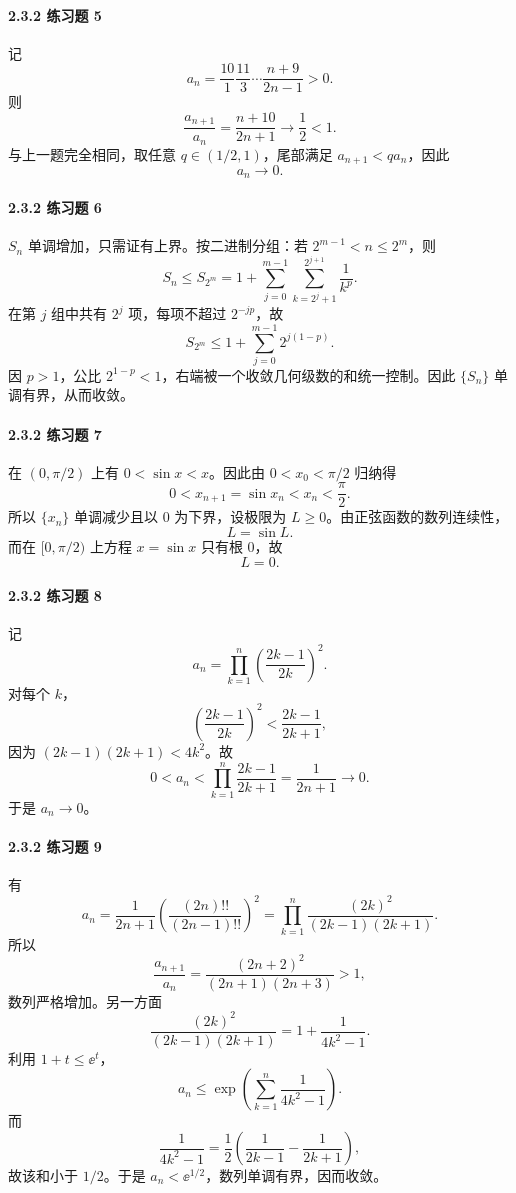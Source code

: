 \paragraph{2.3.2 练习题 5}
\begin{xsolution}
记
\[
  a_n=\frac{10}{1}\frac{11}{3}\cdots\frac{n+9}{2n-1}>0.
\]
则
\[
  \frac{a_{n+1}}{a_n}=\frac{n+10}{2n+1}\to\frac12<1.
\]
与上一题完全相同，取任意 $q\in(1/2,1)$，尾部满足 $a_{n+1}<qa_n$，因此
\[
  \boxed{a_n\to0}.
\]
\end{xsolution}

\paragraph{2.3.2 练习题 6}
\begin{xsolution}
$S_n$ 单调增加，只需证有上界。按二进制分组：若 $2^{m-1}<n\le2^m$，则
\[
  S_n\le S_{2^m}
  =1+\sum_{j=0}^{m-1}\sum_{k=2^j+1}^{2^{j+1}}\frac1{k^p}.
\]
在第 $j$ 组中共有 $2^j$ 项，每项不超过 $2^{-jp}$，故
\[
  S_{2^m}\le1+\sum_{j=0}^{m-1}2^{j(1-p)}.
\]
因 $p>1$，公比 $2^{1-p}<1$，右端被一个收敛几何级数的和统一控制。因此 $\{S_n\}$ 单调有界，从而收敛。
\end{xsolution}

\paragraph{2.3.2 练习题 7}
\begin{xsolution}
在 $(0,\pi/2)$ 上有 $0<\sin x<x$。因此由 $0<x_0<\pi/2$ 归纳得
\[
  0<x_{n+1}=\sin x_n<x_n<\frac\pi2.
\]
所以 $\{x_n\}$ 单调减少且以 $0$ 为下界，设极限为 $L\ge0$。由正弦函数的数列连续性，
\[
  L=\sin L.
\]
而在 $[0,\pi/2)$ 上方程 $x=\sin x$ 只有根 $0$，故
\[
  \boxed{L=0}.
\]
\end{xsolution}

\paragraph{2.3.2 练习题 8}
\begin{xsolution}
记
\[
  a_n=\prod_{k=1}^n\left(\frac{2k-1}{2k}\right)^2.
\]
对每个 $k$，
\[
  \left(\frac{2k-1}{2k}\right)^2
  <\frac{2k-1}{2k+1},
\]
因为 $(2k-1)(2k+1)<4k^2$。故
\[
  0<a_n<\prod_{k=1}^n\frac{2k-1}{2k+1}
  =\frac1{2n+1}\to0.
\]
于是 $a_n\to0$。
\end{xsolution}

\paragraph{2.3.2 练习题 9}
\begin{xsolution}
有
\[
  a_n=\frac1{2n+1}\left(\frac{(2n)!!}{(2n-1)!!}\right)^2
  =\prod_{k=1}^n\frac{(2k)^2}{(2k-1)(2k+1)}.
\]
所以
\[
  \frac{a_{n+1}}{a_n}
  =\frac{(2n+2)^2}{(2n+1)(2n+3)}>1,
\]
数列严格增加。另一方面
\[
  \frac{(2k)^2}{(2k-1)(2k+1)}
  =1+\frac1{4k^2-1}.
\]
利用 $1+t\le\ee^t$，
\[
  a_n\le\exp\left(\sum_{k=1}^n\frac1{4k^2-1}\right).
\]
而
\[
  \frac1{4k^2-1}
  =\frac12\left(\frac1{2k-1}-\frac1{2k+1}\right),
\]
故该和小于 $1/2$。于是 $a_n<\ee^{1/2}$，数列单调有界，因而收敛。
\end{xsolution}

